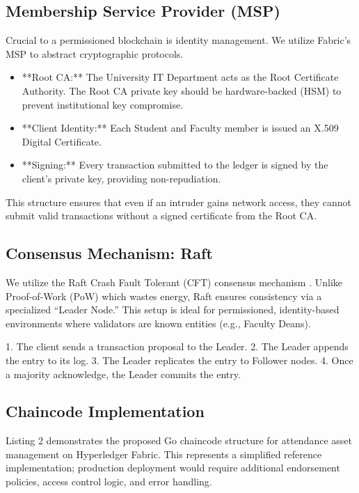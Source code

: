 \documentclass[conference]{IEEEtran}
\begin{document}
\subsection{Membership Service Provider (MSP)}
Crucial to a permissioned blockchain is identity management. We utilize Fabric's MSP to abstract cryptographic protocols.
\begin{itemize}
    \item **Root CA:** The University IT Department acts as the Root Certificate Authority. The Root CA private key should be hardware-backed (HSM) to prevent institutional key compromise.
    \item **Client Identity:** Each Student and Faculty member is issued an X.509 Digital Certificate.
    \item **Signing:** Every transaction submitted to the ledger is signed by the client's private key, providing non-repudiation.
\end{itemize}
This structure ensures that even if an intruder gains network access, they cannot submit valid transactions without a signed certificate from the Root CA.

\subsection{Consensus Mechanism: Raft}
We utilize the Raft Crash Fault Tolerant (CFT) consensus mechanism \cite{b15}. Unlike Proof-of-Work (PoW) which wastes energy, Raft ensures consistency via a specialized ``Leader Node.'' This setup is ideal for permissioned, identity-based environments where validators are known entities (e.g., Faculty Deans).

1. The client sends a transaction proposal to the Leader.
2. The Leader appends the entry to its log.
3. The Leader replicates the entry to Follower nodes.
4. Once a majority acknowledge, the Leader commits the entry.

\subsection{Chaincode Implementation}
Listing 2 demonstrates the proposed Go chaincode structure for attendance asset management on Hyperledger Fabric. This represents a simplified reference implementation; production deployment would require additional endorsement policies, access control logic, and error handling.
\end{document}
